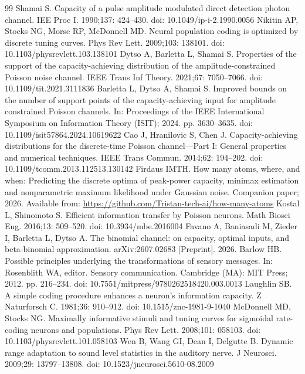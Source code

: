\begin{thebibliography}{99}
 Shamai S. Capacity of a pulse amplitude modulated direct detection photon channel. IEE Proc I. 1990;137: 424--430. doi: 10.1049/ip-i-2.1990.0056
 Nikitin AP, Stocks NG, Morse RP, McDonnell MD. Neural population coding is optimized by discrete tuning curves. Phys Rev Lett. 2009;103: 138101. doi: 10.1103/physrevlett.103.138101
 Dytso A, Barletta L, Shamai S. Properties of the support of the capacity-achieving distribution of the amplitude-constrained Poisson noise channel. IEEE Trans Inf Theory. 2021;67: 7050--7066. doi: 10.1109/tit.2021.3111836
 Barletta L, Dytso A, Shamai S. Improved bounds on the number of support points of the capacity-achieving input for amplitude constrained Poisson channels. In: Proceedings of the IEEE International Symposium on Information Theory (ISIT); 2024. pp. 3630--3635. doi: 10.1109/isit57864.2024.10619622
 Cao J, Hranilovic S, Chen J. Capacity-achieving distributions for the discrete-time Poisson channel---Part I: General properties and numerical techniques. IEEE Trans Commun. 2014;62: 194--202. doi: 10.1109/tcomm.2013.112513.130142
 Firdaus IMTH. How many atoms, where, and when: Predicting the discrete optima of peak-power capacity, minimax estimation and nonparametric maximum likelihood under Gaussian noise. Companion paper; 2026. Available from: \url{https://github.com/Tristan-tech-ai/how-many-atoms}
 Kostal L, Shinomoto S. Efficient information transfer by Poisson neurons. Math Biosci Eng. 2016;13: 509--520. doi: 10.3934/mbe.2016004
 Favano A, Baniasadi M, Zieder I, Barletta L, Dytso A. The binomial channel: on capacity, optimal inputs, and beta-binomial approximation. arXiv:2607.02683 [Preprint]. 2026.
 Barlow HB. Possible principles underlying the transformations of sensory messages. In: Rosenblith WA, editor. Sensory communication. Cambridge (MA): MIT Press; 2012. pp. 216--234. doi: 10.7551/mitpress/9780262518420.003.0013%
 Laughlin SB. A simple coding procedure enhances a neuron's information capacity. Z Naturforsch C. 1981;36: 910--912. doi: 10.1515/znc-1981-9-1040
 McDonnell MD, Stocks NG. Maximally informative stimuli and tuning curves for sigmoidal rate-coding neurons and populations. Phys Rev Lett. 2008;101: 058103. doi: 10.1103/physrevlett.101.058103
 Wen B, Wang GI, Dean I, Delgutte B. Dynamic range adaptation to sound level statistics in the auditory nerve. J Neurosci. 2009;29: 13797--13808. doi: 10.1523/jneurosci.5610-08.2009

\end{thebibliography}
